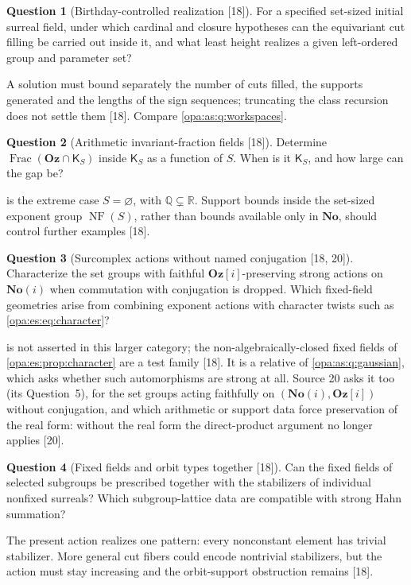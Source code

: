 \documentclass[11pt,oneside]{article}
\numberwithin{equation}{section}
\theoremstyle{definition}
\newtheorem{question}[question]{Question}
\theoremstyle{remark}
\newcommand{\No}{\mathbf{No}}
\newcommand{\Oz}{\mathbf{Oz}}
\newcommand{\Og}{\mathbf{Oz}[i]}
\newcommand{\SC}{\mathbf{No}(i)}
\newcommand{\R}{\mathbb R}
\newcommand{\Q}{\mathbb Q}
\newcommand{\Frac}{\operatorname{Frac}}
\newcommand{\src}[1]{\textup{\textsf{\small[#1]}}}
\newcommand{\NF}{\operatorname{NF}}
\begin{document}
\begin{question}[Birthday-controlled realization \src{18}]\label{opa:es:q:birthday}
For a specified set-sized initial surreal field, under which cardinal and closure hypotheses can the equivariant cut filling be carried out
inside it, and what least height realizes a given left-ordered group and parameter set?
\end{question}
A solution must bound separately the number of cuts filled, the supports generated and the lengths of the sign sequences; truncating the
class recursion does not settle them \src{18}. Compare \cref{opa:as:q:workspaces}.

\begin{question}[Arithmetic invariant-fraction fields \src{18}]\label{opa:es:q:fractions}
Determine $\Frac(\Oz\cap\mathsf K_S)$ inside $\mathsf K_S$ as a function of $S$. When is it $\mathsf K_S$, and how large can the gap be?
\end{question}
 is the extreme case $S=\varnothing$, with $\Q\subsetneq\R$. Support bounds inside the set-sized exponent group $\NF(S)$,
rather than bounds available only in $\No$, should control further examples \src{18}.

\begin{question}[Surcomplex actions without named conjugation \src{18, 20}]\label{opa:es:q:surcomplex}
Characterize the set groups with faithful $\Og$-preserving strong actions on $\SC$ when commutation with conjugation is dropped. Which fixed-field
geometries arise from combining exponent actions with character twists such as \eqref{opa:es:eq:character}?
\end{question}
 is not asserted in this larger category; the non-algebraically-closed fixed fields of \cref{opa:es:prop:character}
are a test family \src{18}. It is a relative of \cref{opa:as:q:gaussian}, which asks whether such automorphisms are strong at all.
Source 20 asks it too (its Question~5), for the set groups acting faithfully on $(\SC,\Og)$ without conjugation, and which arithmetic or support
data force preservation of the real form: without the real form the direct-product argument no longer applies \src{20}.

\begin{question}[Fixed fields and orbit types together \src{18}]\label{opa:es:q:orbittypes}
Can the fixed fields of selected subgroups be prescribed together with the stabilizers of individual nonfixed surreals? Which subgroup-lattice
data are compatible with strong Hahn summation?
\end{question}
The present action realizes one pattern: every nonconstant element has trivial stabilizer. More general cut fibers could encode nontrivial
stabilizers, but the action must stay increasing and the orbit-support obstruction remains \src{18}.
\end{document}

